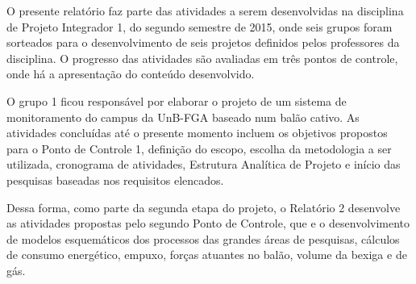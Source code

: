
O presente relatório faz parte das atividades a serem desenvolvidas na disciplina de Projeto Integrador 1, do segundo semestre de 2015, onde seis grupos foram sorteados para o desenvolvimento de seis projetos definidos pelos professores da disciplina. O progresso das atividades são avaliadas em três pontos de controle, onde há a apresentação do conteúdo desenvolvido.

O grupo 1 ficou responsável por elaborar o projeto de um sistema de monitoramento do campus da UnB-FGA baseado num balão cativo. As atividades concluídas até o presente momento incluem os objetivos propostos para o Ponto de Controle 1, definição do escopo, escolha da metodologia a ser utilizada, cronograma de atividades, Estrutura Analítica de Projeto e início das pesquisas baseadas nos requisitos elencados.

Dessa forma, como parte da segunda etapa do projeto, o Relatório 2 desenvolve  as atividades propostas pelo segundo Ponto de Controle, que e o desenvolvimento de modelos esquemáticos dos processos das grandes áreas de pesquisas, cálculos de consumo energético, empuxo, forças atuantes no balão, volume da bexiga e de gás. 